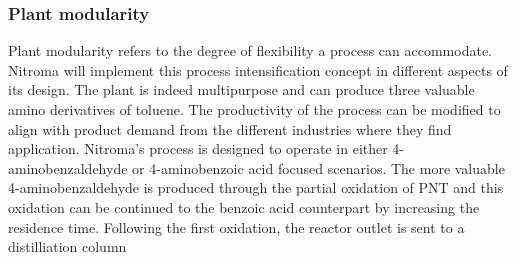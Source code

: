 \subsubsection{Plant modularity} %
Plant modularity refers to the degree of flexibility a process can accommodate. Nitroma will implement this process intensification concept in different aspects of its design. The plant is indeed multipurpose and can produce three valuable amino derivatives of toluene. The productivity of the process can be modified to align with product demand from the different industries where they find application. Nitroma's process is designed to operate in either 4-aminobenzaldehyde or 4-aminobenzoic acid focused scenarios. The more valuable 4-aminobenzaldehyde is produced through the partial oxidation of PNT and this oxidation can be continued to the benzoic acid counterpart by increasing the residence time. Following the first oxidation, the reactor outlet is sent to a distilliation column 








